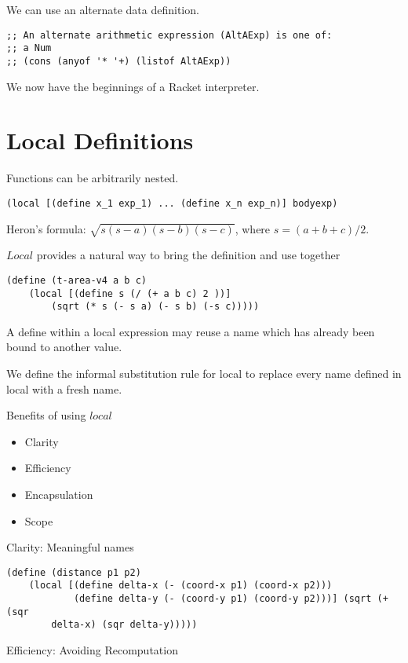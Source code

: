 \documentclass{article}
\begin{document}
We can use an alternate data definition. 

\begin{lstlisting}
;; An alternate arithmetic expression (AltAExp) is one of:
;; a Num
;; (cons (anyof '* '+) (listof AltAExp))
\end{lstlisting}

We now have the beginnings of a Racket interpreter. 

\section{Local Definitions}

Functions can be arbitrarily nested. 

\begin{lstlisting}
(local [(define x_1 exp_1) ... (define x_n exp_n)] bodyexp)
\end{lstlisting}

Heron's formula: $\sqrt{s(s-a)(s-b)(s-c)}$, where $s = (a + b + c)/2$.

$Local$ provides a natural way to bring the definition and use together
\begin{lstlisting}
(define (t-area-v4 a b c)
    (local [(define s (/ (+ a b c) 2 ))]
        (sqrt (* s (- s a) (- s b) (-s c)))))
\end{lstlisting}

A define within a local expression may reuse a name which has already been bound to another value. 

We define the informal substitution rule for local to replace every name defined in local with a fresh name. 

Benefits of using $local$
\begin{itemize}
    \item Clarity
    \item Efficiency
    \item Encapsulation
    \item Scope
\end{itemize}

Clarity: Meaningful names

\begin{lstlisting}
(define (distance p1 p2)
    (local [(define delta-x (- (coord-x p1) (coord-x p2)))
            (define delta-y (- (coord-y p1) (coord-y p2)))] (sqrt (+ (sqr 
        delta-x) (sqr delta-y)))))
\end{lstlisting}


Efficiency: Avoiding Recomputation
\end{document}
